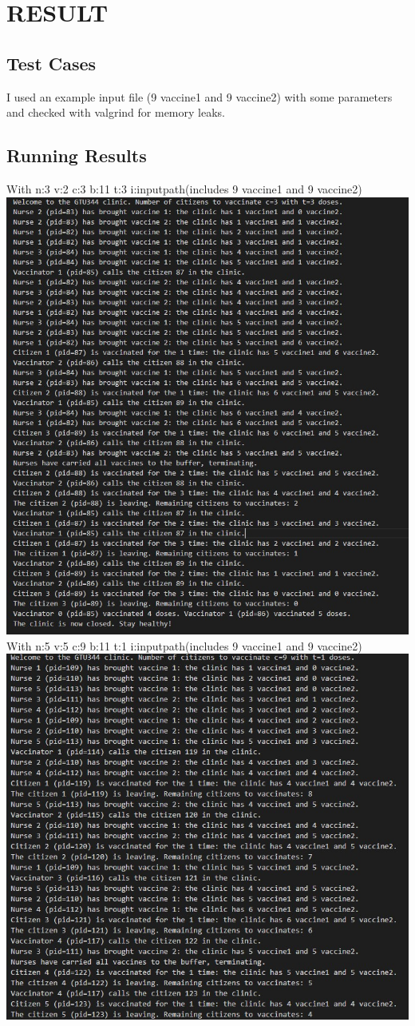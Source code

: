 \documentclass[12pt]{article}
\begin{document}
\section{RESULT}
\subsection{Test Cases}
I used an example input file (9 vaccine1 and 9 vaccine2) with some parameters and checked with valgrind for memory leaks.
\subsection{Running Results}
With n:3 v:2 c:3 b:11 t:3 i:inputpath(includes 9 vaccine1 and 9 vaccine2)
\includegraphics[]{"example n3 v2 c3 b11 t3.jpg"}\\
With n:5 v:5 c:9 b:11 t:1 i:inputpath(includes 9 vaccine1 and 9 vaccine2)
\includegraphics[]{"example1 n5 v5 c9 b11 t1.jpg"}
\end{document}
